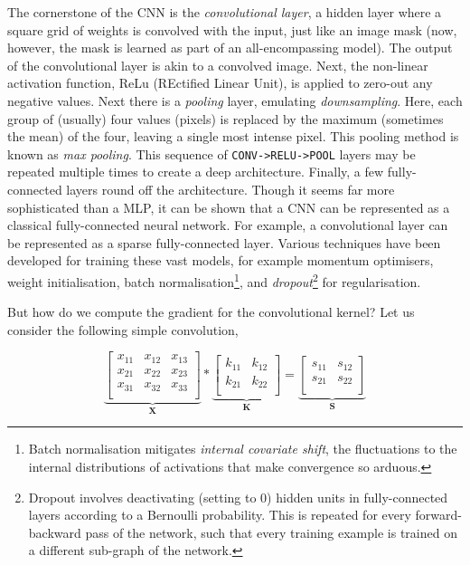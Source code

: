 \documentclass[11pt]{amsart}
\begin{document}
The cornerstone of the CNN is the \emph{convolutional layer}, a hidden layer where a square grid of weights is convolved with the input, just like an image mask (now, however, the mask is learned as part of an all-encompassing model). The output of the convolutional layer is akin to a convolved image. Next, the non-linear activation function, ReLu (REctified Linear Unit), is applied to zero-out any negative values. Next there is a \emph{pooling} layer, emulating \emph{downsampling}. Here, each group of (usually) four values (pixels) is replaced by the maximum (sometimes the mean) of the four, leaving a single most intense pixel. This pooling method is known as \emph{max pooling}. This sequence of \texttt{CONV->RELU->POOL} layers may be repeated multiple times to create a deep architecture. Finally, a few fully-connected layers round off the architecture. Though it seems far more sophisticated than a MLP, it can be shown that a CNN can be represented as a classical fully-connected neural network. For example, a convolutional layer can be represented as a sparse fully-connected layer. Various techniques have been developed for training these vast models, for example momentum optimisers, weight initialisation, batch normalisation\footnote{Batch normalisation mitigates \emph{internal covariate shift}, the fluctuations to the internal distributions of activations that make convergence so arduous.}, and \emph{dropout}\footnote{Dropout involves deactivating (setting to $0$) hidden units in fully-connected layers according to a Bernoulli probability. This is repeated for every forward-backward pass of the network, such that every training example is trained on a different sub-graph of the network.} for regularisation.

But how do we compute the gradient for the convolutional kernel? Let us consider the following simple convolution,

$$
\underbrace{\begin{bmatrix}
x_{11} & x_{12} & x_{13} \\
x_{21} & x_{22} & x_{23} \\
x_{31} & x_{32} & x_{33} \\
\end{bmatrix}}_{\mathbf{X}} * 
\underbrace{\begin{bmatrix}
k_{11} & k_{12} \\
k_{21} & k_{22} \\
\end{bmatrix}}_{\mathbf{K}} =
\underbrace{\begin{bmatrix}
s_{11} & s_{12} \\
s_{21} & s_{22} \\
\end{bmatrix}}_{\mathbf{S}}
$$
\end{document}
